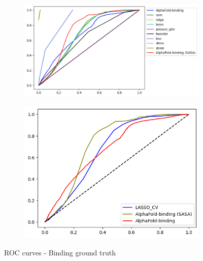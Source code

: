 \begin{figure}[h!]
    \begin{subfigure}{1.1\linewidth}
        \includegraphics[width=\linewidth]{res/ML/roc-binding-total.png}
    \end{subfigure}
    
    \begin{subfigure}{0.8\linewidth}
        \includegraphics[width=\linewidth]{res/ML/roc-binding.png}
    \end{subfigure}
    \caption{ROC curves - Binding ground truth}
\end{figure}

\pagebreak

